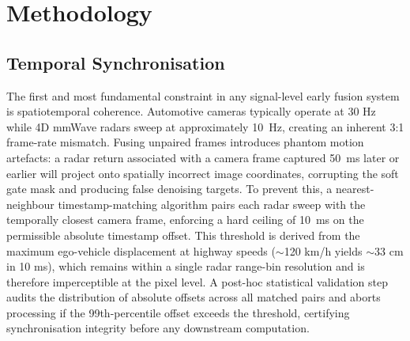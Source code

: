 \documentclass[conference]{IEEEtran}
\begin{document}
\section{Methodology}

\subsection{Temporal Synchronisation}
The first and most fundamental constraint in any signal-level early fusion system is spatiotemporal coherence. Automotive cameras typically operate at 30 Hz while 4D mmWave radars sweep at approximately 10~Hz, creating an inherent 3:1 frame-rate mismatch. Fusing unpaired frames introduces phantom motion artefacts: a radar return associated with a camera frame captured 50~ms later or earlier will project onto spatially incorrect image coordinates, corrupting the soft gate mask and producing false denoising targets. To prevent this, a nearest-neighbour timestamp-matching algorithm pairs each radar sweep with the temporally closest camera frame, enforcing a hard ceiling of 10~ms on the permissible absolute timestamp offset. This threshold is derived from the maximum ego-vehicle displacement at highway speeds ($\sim$120 km/h yields $\sim$33 cm in 10 ms), which remains within a single radar range-bin resolution and is therefore imperceptible at the pixel level. A post-hoc statistical validation step audits the distribution of absolute offsets across all matched pairs and aborts processing if the 99th-percentile offset exceeds the threshold, certifying synchronisation integrity before any downstream computation.
\end{document}
